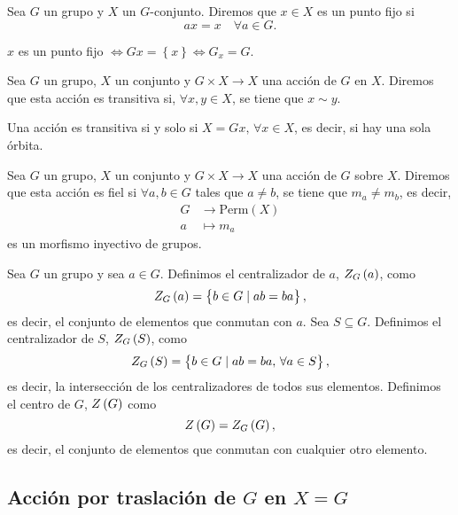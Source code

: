 \begin{defi}
    Sea $G$ un grupo y $X$ un $G$-conjunto. Diremos que $x \in X$ es un punto fijo si 
    \[
        ax = x \quad \forall a \in G.
    \]
\end{defi}
\begin{obs}
    $x$ es un punto fijo $\iff Gx = \left\{ x \right\} \iff G_x = G$.
\end{obs}

\begin{defi}
    Sea $G$ un grupo, $X$ un conjunto y $G \times X \to X$ una acción de $G$ en $X$. Diremos
    que esta acción es transitiva si, $\forall x, y \in X$, se tiene que $x \sim y$.
\end{defi}
\begin{obs}
    Una acción es transitiva si y solo si $X=Gx,\,\forall x\in X$, es decir, si hay una sola órbita.
\end{obs}

\begin{defi}
    Sea $G$ un grupo, $X$ un conjunto y $G \times X \to X$ una acción de $G$ sobre $X$.
    Diremos que esta acción es fiel si $\forall a, b \in G$ tales que $a \neq b$, se tiene que
    $m_a \neq m_b$, es decir,
    \[
        \begin{aligned}
            G &\to \text{Perm}(X) \\
            a &\mapsto m_a
        \end{aligned}
    \]
    es un morfismo inyectivo de grupos.
\end{defi}

\begin{defi}
    Sea $G$ un grupo y sea $a\in G$. Definimos el centralizador de $a$, $Z_G\left( a\right)$, como
    \[
        Z_G\left( a\right) = \left\{ b\in G \mid ab=ba\right\},
    \]
    es decir, el conjunto de elementos que conmutan con $a$. Sea $S\subseteq G$. Definimos el centralizador de $S$, $Z_G\left( S\right)$, como
    \[
        Z_G\left( S\right) = \left\{ b\in G \mid ab=ba, \,\forall a\in S\right\},
    \]
    es decir, la intersección de los centralizadores de todos sus elementos.
    Definimos el centro de $G$, $Z\left( G\right)$ como
    \[
        Z\left( G\right) = Z_G\left( G\right),
    \]
    es decir, el conjunto de elementos que conmutan con cualquier otro elemento.
\end{defi}

\subsection{Acción por traslación de $G$ en $X= G$}


